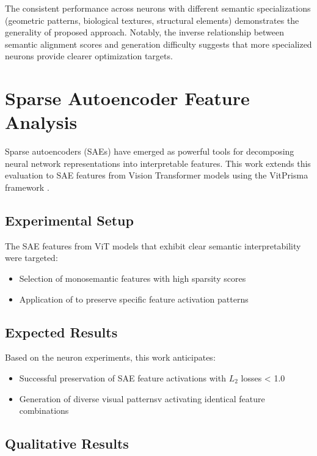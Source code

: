 The consistent performance across neurons with different semantic specializations (geometric patterns, biological textures, structural elements) demonstrates the generality of proposed approach. Notably, the inverse relationship between semantic alignment scores and generation difficulty suggests that more specialized neurons provide clearer optimization targets.

\section{Sparse Autoencoder Feature Analysis}

Sparse autoencoders (SAEs) have emerged as powerful tools for decomposing neural network representations into interpretable features. This work extends this evaluation to SAE features from Vision Transformer models using the VitPrisma framework \citep{joseph2025prismaopensourcetoolkit}.

\subsection{Experimental Setup}

The SAE features from ViT models that exhibit clear semantic interpretability were targeted:
\begin{itemize}
\item Selection of monosemantic features with high sparsity scores
\item Application of \method{} to preserve specific feature activation patterns
\end{itemize}

\subsection{Expected Results}

Based on the neuron experiments, this work anticipates:
\begin{itemize}
\item Successful preservation of SAE feature activations with $L_2$ losses < 1.0
\item Generation of diverse visual patternsv activating identical feature combinations
\end{itemize}

\subsection{Qualitative Results}

